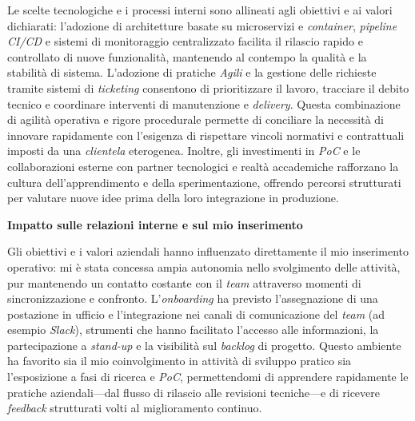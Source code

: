 Le scelte tecnologiche e i processi interni sono allineati agli obiettivi e ai valori dichiarati: l'adozione di architetture basate su microservizi e \emph{container},
\emph{pipeline} \emph{CI/CD} e sistemi di monitoraggio centralizzato facilita il rilascio rapido e controllato di nuove funzionalità, mantenendo al contempo la qualità e la stabilità di sistema.
L'adozione di pratiche \emph{Agili} e la gestione delle richieste tramite sistemi di \emph{ticketing} consentono di prioritizzare il lavoro, tracciare il debito tecnico e coordinare interventi
di manutenzione e \emph{delivery}. Questa combinazione di agilità operativa e rigore procedurale permette di conciliare la necessità di innovare rapidamente con l'esigenza di rispettare
vincoli normativi e contrattuali imposti da una \emph{clientela} eterogenea. Inoltre, gli investimenti in \emph{PoC} e le collaborazioni esterne con partner tecnologici e realtà accademiche
rafforzano la cultura dell'apprendimento e della sperimentazione, offrendo percorsi strutturati per valutare nuove idee prima della loro integrazione in produzione.

\medskip
\noindent\textbf{Impatto sulle relazioni interne e sul mio inserimento}

Gli obiettivi e i valori aziendali hanno influenzato direttamente il mio inserimento operativo: mi è stata concessa ampia autonomia nello svolgimento delle attività,
pur mantenendo un contatto costante con il \emph{team} attraverso momenti di sincronizzazione e confronto. L'\emph{onboarding} ha previsto l'assegnazione di una postazione in ufficio e
l'integrazione nei canali di comunicazione del \emph{team} (ad esempio \emph{Slack}), strumenti che hanno facilitato l'accesso alle informazioni, la partecipazione a \emph{stand-up} e la
visibilità sul \emph{backlog} di progetto. Questo ambiente ha favorito sia il mio coinvolgimento in attività di sviluppo pratico sia l'esposizione a fasi di ricerca e \emph{PoC},
permettendomi di apprendere rapidamente le pratiche aziendali—dal flusso di rilascio alle revisioni tecniche—e di ricevere \emph{feedback} strutturati volti al miglioramento continuo.